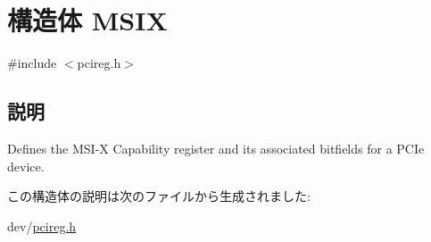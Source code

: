 \hypertarget{structMSIX}{
\section{構造体 MSIX}
\label{structMSIX}
}


{\ttfamily \#include $<$pcireg.h$>$}

\subsection{説明}
Defines the MSI-\/X Capability register and its associated bitfields for a PCIe device. 

この構造体の説明は次のファイルから生成されました:\begin{DoxyCompactItemize}
\item 
dev/\hyperlink{pcireg_8h}{pcireg.h}\end{DoxyCompactItemize}
